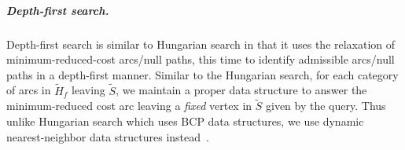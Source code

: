 \documentclass[a4paper,UKenglish]{socg-lipics-v2018}
\makeatletter
\def\polylog{\mathop{\mathrm{polylog}}}
\theoremstyle{plain}
\numberwithin{figure}{section}
\renewcommand{\paragraph}{\subparagraph}
\def\n@te#1{\textsf{\boldmath \textbf{$\langle\!\langle$#1$\rangle\!\rangle$}}\leavevmode}
\def\note#1{\textcolor{red}{\n@te{#1}}}
\makeatother
\begin{document}
%


\paragraph{Depth-first search.}
Depth-first search is similar to Hungarian search in that it
uses the relaxation of minimum-reduced-cost arcs/null paths, this time to
identify admissible arcs/null paths in a depth-first manner.
%
Similar to the Hungarian search, for each category of arcs in $\tilde{H}_f$
leaving $\tilde{S}$, we maintain a proper data structure to answer the
minimum-reduced cost arc leaving a \emph{fixed} vertex in $\tilde{S}$ given
by the query.
Thus unlike Hungarian search which uses BCP data structures, we use dynamic
nearest-neighbor data structures instead~\cite{KMRSS17}.
%
\end{document}
